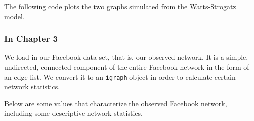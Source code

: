 \documentclass[12pt,twoside]{amherstthesis}
\begin{document}
  The following code plots the two graphs simulated from the
  Watts-Strogatz model.
  
  \begin{Shaded}
  \begin{Highlighting}[]
  \NormalTok{(}\NormalTok{(}\NormalTok{,}\NormalTok{))}
   \NormalTok{, } \NormalTok{)}
   \NormalTok{, } \NormalTok{, }
  \end{Highlighting}
  \end{Shaded}
  
  \subsubsection{In Chapter 3}\label{in-chapter-3}
  
  We load in our Facebook data set, that is, our observed network. It is a
  simple, undirected, connected component of the entire Facebook network
  in the form of an edge list. We convert it to an \texttt{igraph} object
  in order to calculate certain network statistics.
  
  \begin{Shaded}
  \begin{Highlighting}[]
  \NormalTok{(}\NormalTok{)}
  
  \StringTok{ }\NormalTok{(}\NormalTok{(}\NormalTok{), }
                                  
  
  \StringTok{ }
  \end{Highlighting}
  \end{Shaded}
  
  Below are some values that characterize the observed Facebook network,
  including some descriptive network statistics.
  
\end{document}
